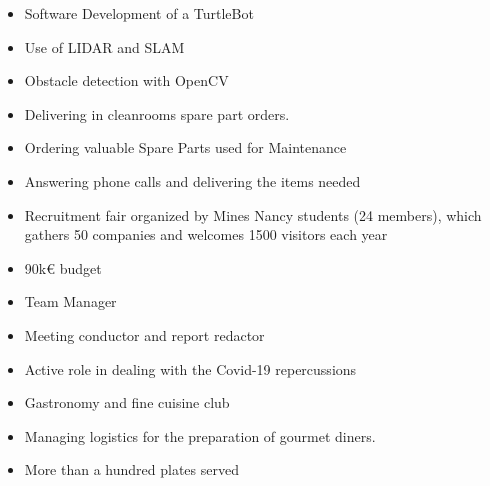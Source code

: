 \documentclass[10pt,a4paper,ragged2e,withhyper]{altacv}
\begin{document}
\begin{paracol}{2}
\divider
\medskip



\begin{itemize} 
\item Software Development of a TurtleBot
\item Use of LIDAR and SLAM
\item Obstacle detection with OpenCV
\end{itemize}

\divider
\newpage


\begin{itemize}
    \item Delivering in cleanrooms spare part orders.
    \item Ordering valuable Spare Parts used for Maintenance
    \item Answering phone calls and delivering the items needed
\end{itemize}


\hardivider


\begin{itemize}
\item Recruitment fair organized by Mines Nancy students (24 members), which gathers 50 companies and welcomes 1500 visitors each year
\item 90k€ budget 
\item Team Manager 
\item Meeting conductor and report redactor
\item Active role in dealing with the Covid-19 repercussions
\end{itemize}

\divider
\medskip


\begin{itemize}
    \item Gastronomy and fine cuisine club
    \item Managing logistics for the preparation of gourmet diners.
    \item More than a hundred plates served
\end{itemize}


\end{paracol}
\end{document}
